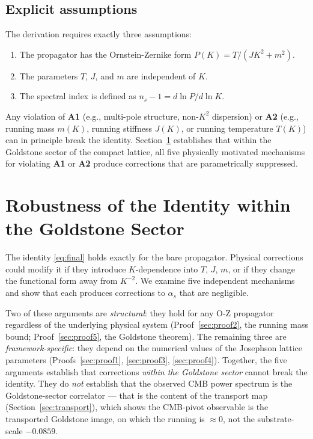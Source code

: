 \documentclass[12pt]{article}
\theoremstyle{definition}
\theoremstyle{remark}
\begin{document}
\subsection{Explicit assumptions}

The derivation requires exactly three assumptions:

\begin{enumerate}
  \item[\textbf{A1.}] The propagator has the Ornstein-Zernike form $P(K) = T/(JK^2 + m^2)$.
  \item[\textbf{A2.}] The parameters $T$, $J$, and $m$ are independent of $K$.
  \item[\textbf{A3.}] The spectral index is defined as $n_s - 1 = d\ln P/d\ln K$.
\end{enumerate}

Any violation of \textbf{A1} (e.g., multi-pole structure, non-$K^2$ dispersion) or \textbf{A2} (e.g., running mass $m(K)$, running stiffness $J(K)$, or running temperature $T(K)$) can in principle break the identity. Section~\ref{sec:proofs} establishes that within the Goldstone sector of the compact lattice, all five physically motivated mechanisms for violating \textbf{A1} or \textbf{A2} produce corrections that are parametrically suppressed.

\section{Robustness of the Identity within the Goldstone Sector}\label{sec:proofs}

The identity \eqref{eq:final} holds exactly for the bare propagator. Physical corrections could modify it if they introduce $K$-dependence into $T$, $J$, $m$, or if they change the functional form away from $K^{-2}$. We examine five independent mechanisms and show that each produces corrections to $\alpha_s$ that are negligible.

Two of these arguments are \emph{structural}: they hold for any O-Z propagator regardless of the underlying physical system (Proof~\ref{sec:proof2}, the running mass bound; Proof~\ref{sec:proof5}, the Goldstone theorem). The remaining three are \emph{framework-specific}: they depend on the numerical values of the Josephson lattice parameters (Proofs~\ref{sec:proof1}, \ref{sec:proof3}, \ref{sec:proof4}). Together, the five arguments establish that corrections \emph{within the Goldstone sector} cannot break the identity. They do \emph{not} establish that the observed CMB power spectrum is the Goldstone-sector correlator --- that is the content of the transport map (Section~\ref{sec:transport}), which shows the CMB-pivot observable is the transported Goldstone image, on which the running is $\approx 0$, not the substrate-scale $-0.0859$.
\end{document}

